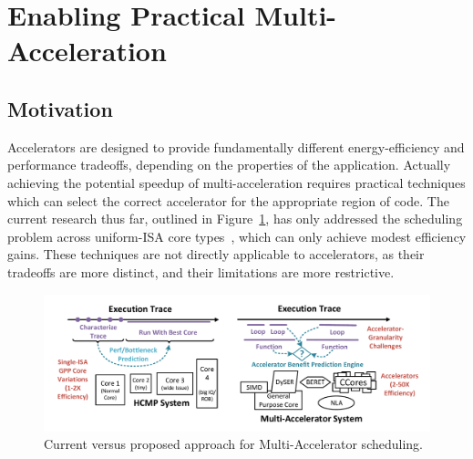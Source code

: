 \section{Enabling Practical Multi-Acceleration} \label{sec:multi-acc}

\subsection{Motivation}
Accelerators are designed to provide fundamentally different energy-efficiency
and performance tradeoffs, depending on the properties of the application.
Actually achieving the potential speedup of multi-acceleration
requires practical techniques which can select the correct accelerator 
for the appropriate region of code.  The current research thus far,
outlined in Figure~\ref{fig:multi-acc-overview}, 
has only addressed the scheduling problem across uniform-ISA 
core types~\cite{Navada:2013:UVN:2523721.2523743,Lukefahr:2012:CCP:2457472.2457508},
which can only achieve modest efficiency gains.  These techniques are not
directly applicable to accelerators, as their tradeoffs are more distinct,
and their limitations are more restrictive. 


\begin{figure}
  \begin{center}
    \includegraphics[width=0.8\linewidth]{figs/multi-acc-overview.pdf}
  \end{center}
\vspace{-0.2in}
  \caption{Current versus proposed approach for Multi-Accelerator scheduling.}
  \label{fig:multi-acc-overview}
\vspace{-0.05in}
\end{figure}


 

